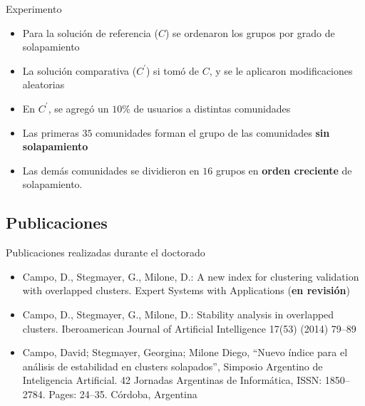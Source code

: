 \begin{frame}[t]

	\begin{block}{Experimento}
		\begin{itemize}
			\item<1-> Para la solución de referencia ($C$) se ordenaron los grupos por grado de solapamiento
			\item<2-> La solución comparativa ($C^\prime$) si tomó de $C$, y se le aplicaron modificaciones aleatorias
			\item<3-> En $C^\prime$, se agregó un $10\%$ de usuarios a distintas comunidades
			\item<4-> Las primeras $35$ comunidades forman el grupo de las comunidades \textbf{sin solapamiento}
			\item<5-> Las demás comunidades se dividieron en $16$ grupos en \textbf{orden creciente} de solapamiento.
		\end{itemize}
	\end{block}
\end{frame}

\begin{frame}[t]
\vspace{-4mm}
	\begin{scriptsize}
		\begin{center}
			{\texttt{[image: \{../figs/rt5\_1]}.jpg}}
		\end{center}		
	\end{scriptsize}
\end{frame}

\subsection{Publicaciones}
\begin{frame}[t]
		\begin{block}{{Publicaciones realizadas durante el doctorado}}
			\begin{center}
				\begin{itemize}
					\item  {Campo, D., Stegmayer, G., Milone, D.: A new index for clustering validation with overlapped
clusters. Expert Systems with Applications (\textbf{en revisión})} 		
					\item  Campo, D., Stegmayer, G., Milone, D.: Stability analysis in overlapped clusters. Iberoamerican
Journal of Artificial Intelligence 17(53) (2014) 79–89 
					\item  Campo, David; Stegmayer, Georgina; Milone Diego, ``Nuevo índice para el análisis de
estabilidad en clusters solapados'', Simposio Argentino de Inteligencia Artificial. 42 Jornadas
Argentinas de Informática, ISSN: 1850–2784. Pages: 24–35.
Córdoba, Argentina
				\end{itemize}
			\end{center}		
		\end{block}
\end{frame}
